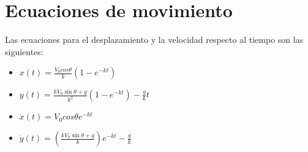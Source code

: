 \documentclass{article}
\begin{document}
 

\section{Ecuaciones de movimiento}
Las ecuaciones para el desplazamiento y la velocidad respecto al tiempo son las siguientes:
\vspace{5 mm}
\begin{itemize}
  \item $x(t) = \frac{V_{0} cos \theta}{k} \left( 1-e^{-kt} \right)$
  \item $y(t) = \frac{kV_{0}\sin\theta+g}{k^2} (1-e^{-kt}) - \frac{g}{k}t$
  \item $\dot{x} (t) = V_{0}cos \theta e^{-kt}$
  \item $\dot{y} (t) = \left (\frac{kV_{0}\sin\theta+g}{k} \right)e^{-kt} - \frac{g}{k}$
\end{itemize}
\end{document}
